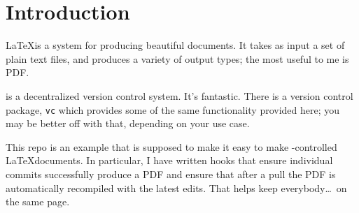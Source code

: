 \section{Introduction}\label{sec:intro}

\LaTeX is a system for producing beautiful documents.
It takes as input a set of plain text files, and produces a variety of output types; the most useful to me is PDF.

\git is a decentralized version control system.
It's fantastic.
There is a version control package, \texttt{vc}\cite{vc} which provides some of the same functionality provided here; you may be better off with that, depending on your use case.

This repo\cite{latex-base} is an example that is supposed to make it easy to make \git-controlled \LaTeX documents.
In particular, I have written \git hooks that ensure individual commits successfully produce a PDF and ensure that after a pull the PDF is automatically recompiled with the latest edits.
That helps keep everybody\ldots\ on the same page.